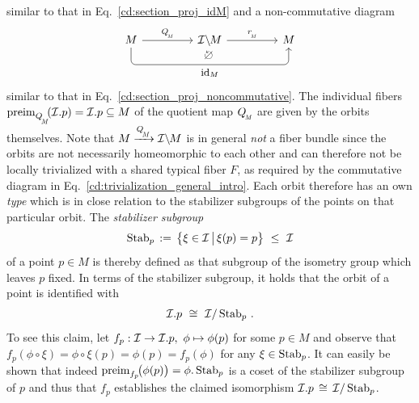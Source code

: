 similar to that in Eq.~\eqref{cd:section_proj_idM} and a non-commutative diagram
\begin{equation}
\begin{tikzcd}[row sep=3em, column sep=4.5em,
               execute at end picture={
                    \node [] at (-.04, -.46) {$\noncommutative$};
                    }]
      M
            \arrow[r, "\QM"]
            \arrow[rr, rounded corners, to path={ 
                  -- ([yshift=-3.5ex]\tikztostart.south) 
                  --node[below, pos=.5]{\small$\id_M$} ([yshift=-3.5ex]\tikztotarget.south) 
                  -- (\tikztotarget.south)
                  }]
    & \IM
            \arrow[r, "\rM"]
    & M
\end{tikzcd}
\end{equation}
similar to that in Eq.~\eqref{cd:section_proj_noncommutative}.
The individual fibers $\preim{\QM}\mkern-4mu(\I.p) = \I.p \subseteq M$ of the quotient map $\QM$ are given by the orbits themselves.
Note that $M\xrightarrow{\QM}\IM$ is in general \emph{not} a fiber bundle since the orbits are not necessarily homeomorphic to each other and can therefore not be locally trivialized with a shared typical fiber $F$, as required by the commutative diagram in Eq.~\eqref{cd:trivialization_general_intro}.
Each orbit therefore has an own \emph{type} which is in close relation to the stabilizer subgroups of the points on that particular orbit.
The \emph{stabilizer subgroup}
\begin{align}
    \Stab{p} \,:=\, \big\{ \xi \in \I \,\big|\, \xi(p)=p \big\} \ \leq\ \I
\end{align}
of a point $p\in M$ is thereby defined as that subgroup of the isometry group which leaves $p$ fixed.
In terms of the stabilizer subgroup, it holds that the orbit of a point is identified with
\begin{align}
    \mathcal{I}.p \ \cong\ \mathcal{I}/\operatorname{Stab}_{p} \,.
\end{align}
To see this claim, let $f_p: \mathcal{I} \to \mathcal{I}.p,\ \phi \mapsto \phi(p)$ for some $p\in M$ and observe that $f_p(\phi\circ\xi) = \phi\circ\xi(p) = \phi(p) = f_p(\phi)$ for any $\xi\in\operatorname{Stab}_{p}$.
It can easily be shown that indeed $\operatorname{preim}_{f_p}\!\! \big(\phi(p)\big) = \phi.\operatorname{Stab}_{p}$ is a coset of the stabilizer subgroup of $p$ and thus that $f_p$ establishes the claimed isomorphism $\mathcal{I}.p \,\cong\, \mathcal{I}/\operatorname{Stab}_{p}$.

